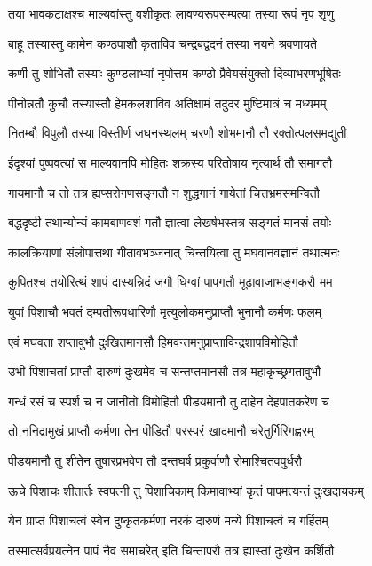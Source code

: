 \twolineshloka
{तया भावकटाक्षश्च माल्यवांस्तु वशीकृतः}
{लावण्यरूपसम्पत्या तस्या रूपं नृप शृणु} %

\twolineshloka
{बाहू तस्यास्तु कामेन कण्ठपाशौ कृताविव}
{चन्द्रबद्वदनं तस्या नयने श्रवणायते} %

\twolineshloka
{कर्णी तु शोभितौ तस्याः कुण्डलाभ्यां नृपोत्तम}
{कण्ठो प्रैवेयसंयुक्तो दिव्याभरणभूषितः} %

\twolineshloka
{पीनोन्नतौ कुचौ तस्यास्तौ हेमकलशाविव}
{अतिक्षामं तदुदर मुष्टिमात्रं च मध्यमम्} %

\twolineshloka
{नितम्बौ विपुलौ तस्या विस्तीर्ण जघनस्थलम्}
{चरणौ शोभमानौ तौ रक्तोत्पलसमद्युती} %

\twolineshloka
{ईदृश्यां पुष्पवत्यां स माल्यवानपि मोहितः}
{शक्रस्य परितोषाय नृत्यार्थ तौ समागतौ} %

\twolineshloka
{गायमानौ च तो तत्र ह्यप्सरोगणसङ्गतौ}
{न शुद्धगानं गायेतां चित्तभ्रमसमन्वितौ} %

\twolineshloka
{बद्धदृष्टी तथान्योन्यं कामबाणवशं गतौ}
{ज्ञात्वा लेखर्षभस्तत्र सङ्गतं मानसं तयोः} %

\twolineshloka
{कालक्रियाणां संलोपात्तथा गीतावभञ्जनात्}
{चिन्तयित्वा तु मघवानवज्ञानं तथात्मनः} %

\twolineshloka
{कुपितश्च तयोरित्थं शापं दास्यन्निदं जगौ}
{धिग्वां पापगतौ मूढावाजाभङ्गकरौ मम} %

\twolineshloka
{युवां पिशाचौ भवतं दम्पतीरूपधारिणौ}
{मृत्युलोकमनुप्राप्तौ भुनानौ कर्मणः फलम्} %

\twolineshloka
{एवं मघवता शप्तावुभौ दुःखितमानसौ}
{हिमवन्तमनुप्राप्ताविन्द्रशापविमोहितौ} %

\twolineshloka
{उभी पिशाचतां प्राप्तौ दारुणं दुःखमेव च}
{सन्तप्तमानसौ तत्र महाकृच्छ्रगतावुभौ} %

\twolineshloka
{गन्धं रसं च स्पर्श च न जानीतो विमोहितौ}
{पीडयमानौ तु दाहेन देहपातकरेण च} %

\twolineshloka
{तो ननिद्रामुखं प्राप्तौ कर्मणा तेन पीडितौ}
{परस्परं खादमानौ चरेतुर्गिरिगह्वरम्} %

\twolineshloka
{पीडयमानौ तु शीतेन तुषारप्रभवेण तौ}
{दन्तघर्ष प्रकुर्वाणौ रोमाश्चितवपुर्धरौ} %

\twolineshloka
{ऊचे पिशाचः शीतार्तः स्वपत्नी तु पिशाचिकाम्}
{किमावाभ्यां कृतं पापमत्यन्तं दुःखदायकम्} %

\twolineshloka
{येन प्राप्तं पिशाचत्वं स्वेन दुष्कृतकर्मणा}
{नरकं दारुणं मन्ये पिशाचत्वं च गर्हितम्} %

\twolineshloka
{तस्मात्सर्वप्रयत्नेन पापं नैव समाचरेत्}
{इति चिन्तापरौ तत्र ह्यास्तां दुःखेन कर्शितौ} %

